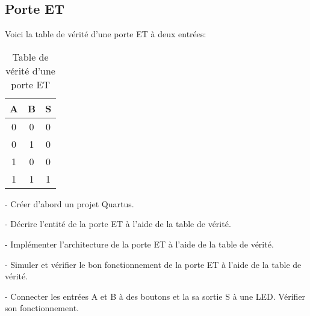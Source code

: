 \subsection{Porte ET}
Voici la table de vérité d'une porte ET à deux entrées:
\begin{table}[ht]
    \centering
    \begin{tabular}{c c|c} 
        A & B & S \\
        \hline
        0 & 0 & 0 \\
        0 & 1 & 0 \\
        1 & 0 & 0 \\
        1 & 1 & 1
    \end{tabular}
    \caption{Table de vérité d'une porte ET}
\end{table}

- Créer d'abord un projet Quartus.

\medskip

- Décrire l'entité de la porte ET à l'aide de la table de vérité.

\medskip

- Implémenter l'architecture de la porte ET à l'aide de la table de vérité.

\medskip

- Simuler et vérifier le bon fonctionnement de la porte ET à l'aide de la table de vérité.

\medskip

- Connecter les entrées A et B à des boutons et la sa sortie S à une LED. Vérifier son fonctionnement.
